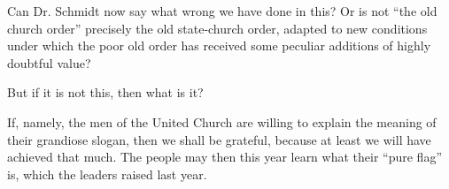 Can Dr. Schmidt now say what wrong we have done in this? Or is not “the old church order” precisely the old state‑church order, adapted to new conditions under which the poor old order has received some peculiar additions of highly doubtful value?

But if it is not this, then what is it?

If, namely, the men of the United Church are willing to explain the meaning of their grandiose slogan, then we shall be grateful, because at least we will have achieved that much. The people may then this year learn what their “pure flag” is, which the leaders raised last year.

